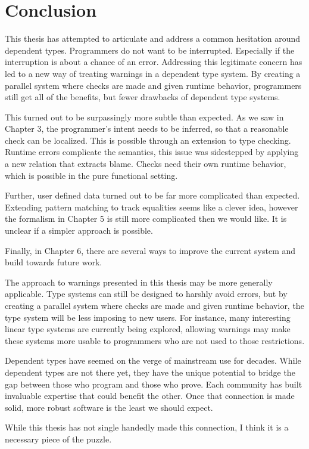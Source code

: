 \chapter{Conclusion}
\label{chapter:Conclusion}
\thispagestyle{myheadings}

This thesis has attempted to articulate and address a common hesitation around dependent types.
Programmers do not want to be interrupted.
Especially if the interruption is about a chance of an error.
Addressing this legitimate concern has led to a new way of treating warnings in a dependent type system.
By creating a parallel system where checks are made and given runtime behavior, programmers still get all of the benefits, but fewer drawbacks of dependent type systems.

This turned out to be surpassingly more subtle than expected.
As we saw in Chapter 3, the programmer's intent needs to be inferred, so that a reasonable check can be localized.
This is possible through an extension to \bidir{} type checking.
Runtime errors complicate the semantics, this issue was sidestepped by applying a new relation that extracts blame.
Checks need their own runtime behavior, which is possible in the pure functional setting.

Further, user defined data turned out to be far more complicated than expected.
Extending pattern matching to track equalities seems like a clever idea, however the formalism in Chapter 5 is still more complicated then we would like.
It is unclear if a simpler approach is possible.

Finally, in Chapter 6, there are several ways to improve the current system and build towards future work.

The approach to warnings presented in this thesis may be more generally applicable.
Type systems can still be designed to harshly avoid errors, but by creating a parallel system where checks are made and given runtime behavior, the type system will be less imposing to new users.
For instance, many interesting linear type systems are currently being explored, allowing warnings may make these systems more usable to programmers who are not used to those restrictions.

Dependent types have seemed on the verge of mainstream use for decades.
While dependent types are not there yet, they have the unique potential to bridge the gap between those who program and those who prove.
Each community has built invaluable expertise that could benefit the other.
Once that connection is made solid, more robust software is the least we should expect.

While this thesis has not single handedly made this connection, I think it is a necessary piece of the puzzle.

